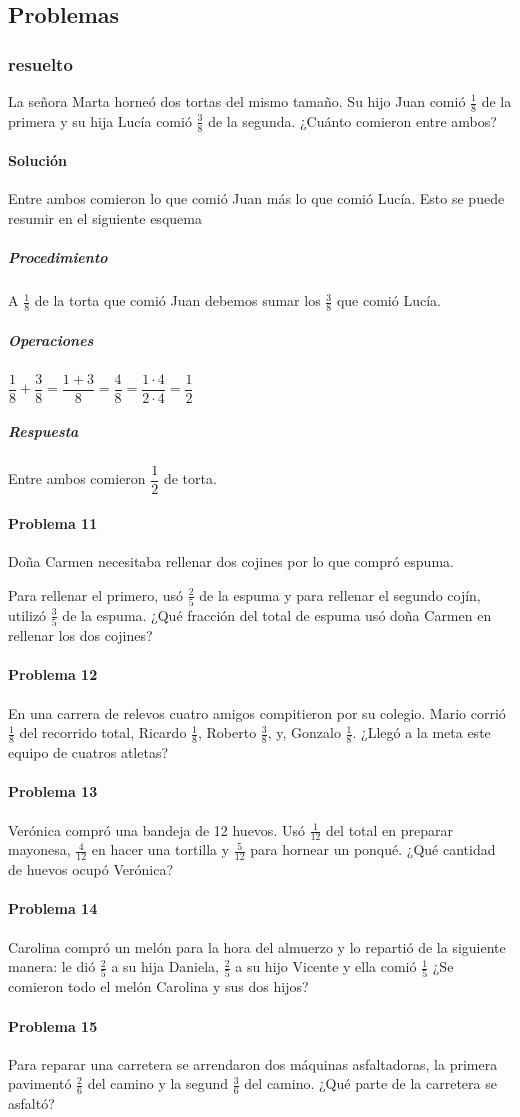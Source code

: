 \documentclass[10pt,twoside]{article}
\begin{document}
\subsection*{Problemas}
\subsubsection*{resuelto}
La señora Marta horneó dos tortas del mismo tamaño. Su hijo Juan comió $\frac{1}{8}$ de la primera y su hija Lucía comió $\frac{3}{8}$ de la segunda. ¿Cuánto comieron entre ambos?
\paragraph*{Solución}
Entre ambos comieron lo que comió Juan más lo que comió Lucía. Esto se puede resumir en el siguiente esquema
\subparagraph*{Procedimiento}
A $\frac{1}{8}$ de la torta que comi\'{o} Juan debemos sumar los $\frac{3}{8}$ que comi\'{o} Luc\'{i}a.
\subparagraph*{Operaciones}
$\dfrac{1}{8}+\dfrac{3}{8}=\dfrac{1+3}{8}=\dfrac{4}{8}=\dfrac{1\cdot 4}{2\cdot 4}=\dfrac{1}{2}$
\subparagraph*{Respuesta}
Entre ambos comieron $\dfrac{1}{2}$ de torta.
\paragraph*{Problema 11}
Doña Carmen necesitaba rellenar dos cojines por lo que compró espuma.

Para rellenar el primero, usó $\frac{2}{5}$ de la espuma y para rellenar el segundo cojín, utilizó $\frac{3}{5}$ de la espuma. ¿Qué fracción del total de espuma usó doña Carmen en rellenar los dos cojines?
\paragraph*{Problema 12}
En una carrera de relevos cuatro amigos compitieron por su colegio. Mario corrió $\frac{1}{8}$ del recorrido total, Ricardo $\frac{1}{8}$, Roberto $\frac{3}{8}$, y, Gonzalo $\frac{1}{8}$. ¿Llegó a la meta este equipo de cuatros atletas?
\paragraph*{Problema 13}
Verónica compró una bandeja de 12 huevos. Usó $\frac{1}{12}$ del total en preparar mayonesa, $\frac{4}{12}$ en hacer una tortilla y $\frac{5}{12}$ para hornear un ponqué. ¿Qué cantidad de huevos ocupó Verónica?
\paragraph*{Problema 14}
Carolina compró un melón para la hora del almuerzo y lo repartió de la siguiente manera: le dió $\frac{2}{5}$ a su hija Daniela, $\frac{2}{5}$ a su hijo Vicente y ella comió $\frac{1}{5}$ ¿Se comieron todo el melón Carolina y sus dos hijos?
\paragraph*{Problema 15}
Para reparar una carretera se arrendaron dos máquinas asfaltadoras, la primera pavimentó $\frac{2}{6}$ del camino y la segund $\frac{3}{6}$ del camino. ¿Qué parte de la carretera se asfaltó?
\end{document}
